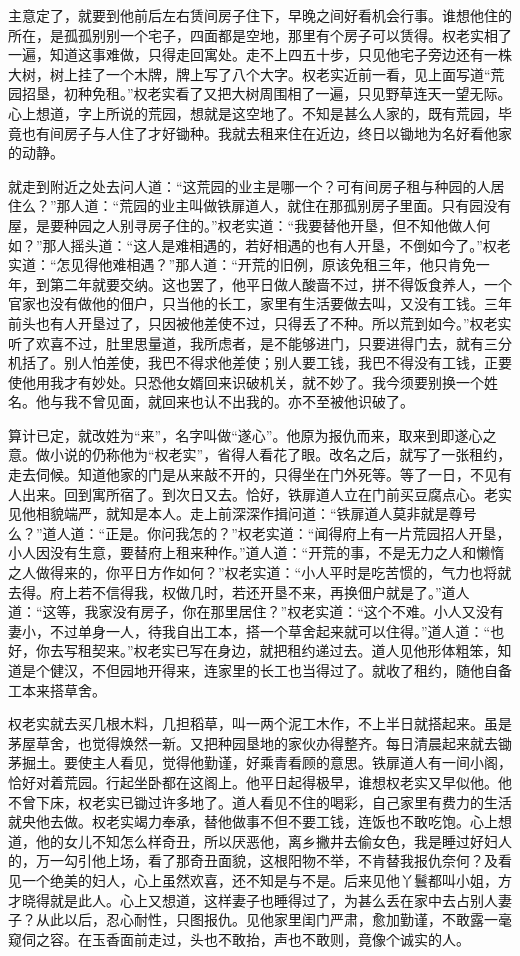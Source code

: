 \documentclass[a4paper,12pt,UTF8,twoside]{ctexbook}
\begin{document}
主意定了，就要到他前后左右赁间房子住下，早晚之间好看机会行事。谁想他住的所在，是孤孤别别一个宅子，四面都是空地，那里有个房子可以赁得。权老实相了一遍，知道这事难做，只得走回寓处。走不上四五十步，只见他宅子旁边还有一株大树，树上挂了一个木牌，牌上写了八个大字。权老实近前一看，见上面写道“荒园招垦，初种免租。”权老实看了又把大树周围相了一遍，只见野草连天一望无际。心上想道，字上所说的荒园，想就是这空地了。不知是甚么人家的，既有荒园，毕竟也有间房子与人住了才好锄种。我就去租来住在近边，终日以锄地为名好看他家的动静。

就走到附近之处去问人道：“这荒园的业主是哪一个？可有间房子租与种园的人居住么？”那人道：“荒园的业主叫做铁扉道人，就住在那孤别房子里面。只有园没有屋，是要种园之人别寻房子住的。”权老实道：“我要替他开垦，但不知他做人何如？”那人摇头道：“这人是难相遇的，若好相遇的也有人开垦，不倒如今了。”权老实道：“怎见得他难相遇？”那人道：“开荒的旧例，原该免租三年，他只肯免一年，到第二年就要交纳。这也罢了，他平日做人酸啬不过，拼不得饭食养人，一个官家也没有做他的佃户，只当他的长工，家里有生活要做去叫，又没有工钱。三年前头也有人开垦过了，只因被他差使不过，只得丢了不种。所以荒到如今。”权老实听了欢喜不过，肚里思量道，我所虑者，是不能够进门，只要进得门去，就有三分机括了。别人怕差使，我巴不得求他差使；别人要工钱，我巴不得没有工钱，正要使他用我才有妙处。只恐他女婿回来识破机关，就不妙了。我今须要别换一个姓名。他与我不曾见面，就回来也认不出我的。亦不至被他识破了。

算计已定，就改姓为“来”，名字叫做“遂心”。他原为报仇而来，取来到即遂心之意。做小说的仍称他为“权老实”，省得人看花了眼。改名之后，就写了一张租约，走去伺候。知道他家的门是从来敲不开的，只得坐在门外死等。等了一日，不见有人出来。回到寓所宿了。到次日又去。恰好，铁扉道人立在门前买豆腐点心。老实见他相貌端严，就知是本人。走上前深深作揖问道：“铁扉道人莫非就是尊号么？”道人道：“正是。你问我怎的？”权老实道：“闻得府上有一片荒园招人开垦，小人因没有生意，要替府上租来种作。”道人道：“开荒的事，不是无力之人和懒惰之人做得来的，你平日方作如何？”权老实道：“小人平时是吃苦惯的，气力也将就去得。府上若不信得我，权做几时，若还开垦不来，再换佃户就是了。”道人道：“这等，我家没有房子，你在那里居住？”权老实道：“这个不难。小人又没有妻小，不过单身一人，待我自出工本，搭一个草舍起来就可以住得。”道人道：“也好，你去写租契来。”权老实已写在身边，就把租约递过去。道人见他形体粗笨，知道是个健汉，不但园地开得来，连家里的长工也当得过了。就收了租约，随他自备工本来搭草舍。

权老实就去买几根木料，几担稻草，叫一两个泥工木作，不上半日就搭起来。虽是茅屋草舍，也觉得焕然一新。又把种园垦地的家伙办得整齐。每日清晨起来就去锄茅掘土。要使主人看见，觉得他勤谨，好乘青看顾的意思。铁扉道人有一间小阁，恰好对着荒园。行起坐卧都在这阁上。他平日起得极早，谁想权老实又早似他。他不曾下床，权老实已锄过许多地了。道人看见不住的喝彩，自己家里有费力的生活就央他去做。权老实竭力奉承，替他做事不但不要工钱，连饭也不敢吃饱。心上想道，他的女儿不知怎么样奇丑，所以厌恶他，离乡撇井去偷女色，我是睡过好妇人的，万一勾引他上场，看了那奇丑面貌，这根阳物不举，不肯替我报仇奈何？及看见一个绝美的妇人，心上虽然欢喜，还不知是与不是。后来见他丫鬟都叫小姐，方才晓得就是此人。心上又想道，这样妻子也睡得过了，为甚么丢在家中去占别人妻子？从此以后，忍心耐性，只图报仇。见他家里闺门严肃，愈加勤谨，不敢露一毫窥伺之容。在玉香面前走过，头也不敢抬，声也不敢则，竟像个诚实的人。
\end{document}
